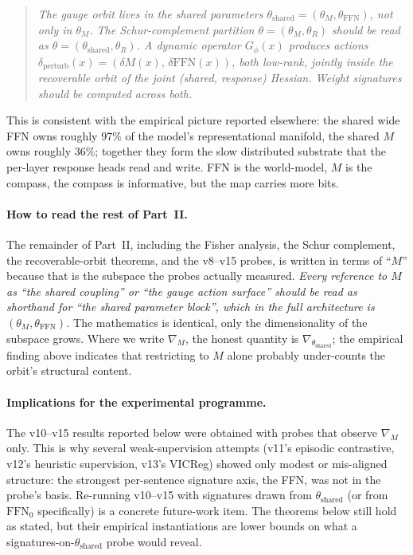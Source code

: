 \documentclass[11pt, a4paper]{article}
\theoremstyle{plain}
\theoremstyle{definition}
\theoremstyle{remark}
\begin{document}
\begin{quote}
\textit{The gauge orbit lives in the \emph{shared} parameters $\theta_{\mathrm{shared}} = (\theta_M, \theta_{\mathrm{FFN}})$, not only in $\theta_M$.
The Schur-complement partition $\theta = (\theta_M, \theta_R)$ should be read as $\theta = (\theta_{\mathrm{shared}}, \theta_R)$.
A dynamic operator $G_\phi(x)$ produces actions $\delta_{\mathrm{perturb}}(x) = (\delta M(x),\, \delta\mathrm{FFN}(x))$, both low-rank, jointly inside the recoverable orbit of the joint (shared, response) Hessian.
Weight signatures should be computed across both.}
\end{quote}

This is consistent with the empirical picture reported elsewhere: the shared wide FFN owns roughly 97\% of the model's representational manifold, the shared $M$ owns roughly 36\%; together they form the slow distributed substrate that the per-layer response heads read and write.
FFN is the world-model, $M$ is the compass, the compass is informative, but the map carries more bits.

\paragraph{How to read the rest of Part~II.}
The remainder of Part~II, including the Fisher analysis, the Schur complement, the recoverable-orbit theorems, and the v8--v15 probes, is written in terms of ``$M$'' because that is the subspace the probes actually measured.
\emph{Every reference to $M$ as ``the shared coupling'' or ``the gauge action surface'' should be read as shorthand for ``the shared parameter block'', which in the full architecture is $(\theta_M, \theta_{\mathrm{FFN}})$.}
The mathematics is identical, only the dimensionality of the subspace grows.
Where we write $\nabla_M$, the honest quantity is $\nabla_{\theta_{\mathrm{shared}}}$; the empirical finding above indicates that restricting to $M$ alone probably under-counts the orbit's structural content.

\paragraph{Implications for the experimental programme.}
The v10--v15 results reported below were obtained with probes that observe $\nabla_M$ only.
This is why several weak-supervision attempts (v11's episodic contrastive, v12's heuristic supervision, v13's VICReg) showed only modest or mis-aligned structure: the strongest per-sentence signature axis, the FFN, was not in the probe's basis.
Re-running v10--v15 with signatures drawn from $\theta_{\mathrm{shared}}$ (or from $\mathrm{FFN}_{0}$ specifically) is a concrete future-work item.
The theorems below still hold as stated, but their empirical instantiations are lower bounds on what a signatures-on-$\theta_{\mathrm{shared}}$ probe would reveal.
\end{document}
